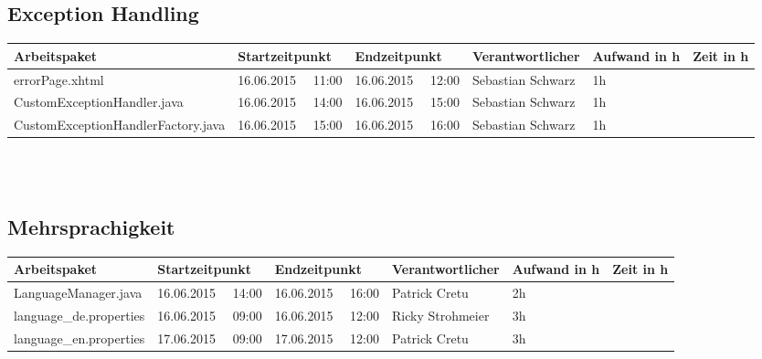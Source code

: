 \begin{landscape}
	\subsection{Exception Handling}
	\begin{tabular}{|p{10.3cm}|p{3.2cm}|p{3.2cm}|p{3.5cm}|p{1.7cm}|p{1.5cm}|}
		\hline  \textbf{Arbeitspaket} & \textbf{Startzeitpunkt} & \textbf{Endzeitpunkt} & \textbf{Verantwortlicher}  & \textbf{Aufwand in h} & \textbf{Zeit in h}\\ 
		\hline   errorPage.xhtml                                        & 16.06.2015 \ \ 11:00       & 16.06.2015 \ \ 12:00        & Sebastian Schwarz & 1h                 & \\  
		\hline   CustomExceptionHandler.java                            & 16.06.2015 \ \ 14:00       & 16.06.2015 \ \ 15:00       & Sebastian Schwarz & 1h                 & \\  
		\hline   CustomExceptionHandlerFactory.java                     & 16.06.2015 \ \ 15:00       & 16.06.2015 \ \ 16:00       & Sebastian Schwarz  & 1h                 &\\  
		\hline 
	\end{tabular} \ \\
	\ \\	
	
	\subsection{Mehrsprachigkeit}
	\begin{tabular}{|p{10.3cm}|p{3.2cm}|p{3.2cm}|p{3.5cm}|p{1.7cm}|p{1.5cm}|}
		\hline  \textbf{Arbeitspaket} & \textbf{Startzeitpunkt} & \textbf{Endzeitpunkt} & \textbf{Verantwortlicher}  & \textbf{Aufwand in h} & \textbf{Zeit in h}\\ 
		\hline   LanguageManager.java                                  & 16.06.2015 \ \ 14:00        & 16.06.2015 \ \ 16:00       & Patrick Cretu  &  2h                 & \\ 
		\hline   language\_de.properties                               & 16.06.2015 \ \ 09:00        & 16.06.2015 \ \ 12:00       & Ricky Strohmeier &  3h                 & \\
		\hline   language\_en.properties                               & 17.06.2015 \ \ 09:00        & 17.06.2015 \ \ 12:00       & Patrick Cretu  &  3h                 & \\ 
		\hline 
	\end{tabular} \ \\
	\ \\
	

\end{landscape}
